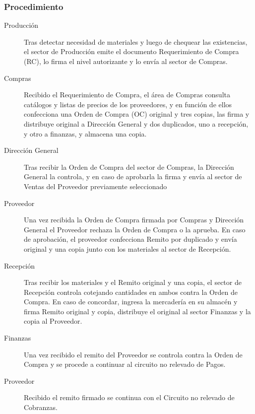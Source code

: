 \subsubsection{Procedimiento}
\begin{description}
\item[Producción] Tras detectar necesidad de materiales y luego de chequear las existencias, el sector de Producción emite el documento Requerimiento de Compra (RC), lo firma el nivel autorizante y lo envía al sector de Compras.
\item[Compras] Recibido el Requerimiento de Compra, el área de Compras consulta catálogos y listas de precios de los proveedores, y en función de ellos confecciona una Orden de Compra (OC) original y tres copias, las firma y distribuye original a Dirección General y dos duplicados, uno a recepción, y otro a finanzas, y almacena una copia.
\item [Dirección General] Tras recibir la Orden de Compra del sector de Compras, la Dirección General la controla, y en caso de aprobarla la firma y envía al sector de Ventas del Proveedor previamente seleccionado
\item [Proveedor] Una vez recibida la Orden de Compra firmada por Compras y Dirección General el Proveedor rechaza la Orden de Compra o la aprueba. En caso de aprobación, el proveedor confecciona Remito por duplicado y envía original y una copia junto con los materiales al sector de Recepción.
\item[Recepción] Tras recibir los materiales y el Remito original y una copia, el sector de Recepción controla cotejando cantidades en ambos contra la Orden de Compra. En caso de concordar, ingresa la mercadería en su almacén y firma Remito original y copia, distribuye el original al sector Finanzas y la copia al Proveedor.
\item[Finanzas] Una vez recibido el remito del Proveedor se controla contra la Orden de Compra y se procede a continuar al circuito no relevado de Pagos.
\item [Proveedor] Recibido el remito firmado se continua con el Circuito no relevado de Cobranzas.
\end{description}